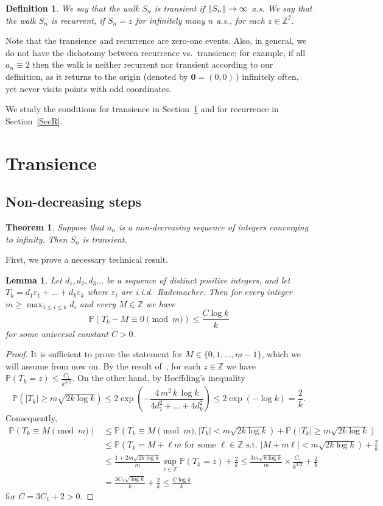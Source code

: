 \documentclass[12pt]{article}
\newtheorem{theorem}{Theorem}
\newtheorem{lemma}{Lemma}
\newtheorem{definition}{Definition}
\newcommand\eps{\varepsilon}
\renewcommand\P{\mathbb{P}}
\newcommand\Z{\mathbb{Z}}
\DeclarePairedDelimiter{\norm}{\lVert}{\rVert}
\begin{document}
\begin{definition}\label{defTR}
We say that the walk $S_n$ is transient if $\norm{S_n}\to\infty$ a.s. We say that the walk $S_n$ is {\em recurrent}, if $S_n=z$ for infinitely many $n$ a.s., for each $z\in\Z^2$.
\end{definition}

Note that the transience and recurrence are zero-one events. Also, in general, we do not have the dichotomy between recurrence vs.\ transience; for example, if all $a_n\equiv 2$ then the walk is neither recurrent nor transient according to our definition, as it returns to the origin (denoted by $\mathbf{0}=(0,0)$\,) infinitely often, yet never visits points with odd coordinates.

We study the conditions for transience in Section~\ref{SecT} and for recurrence in Section~\ref{SecR}.


\section{Transience}\label{SecT}
\subsection{Non-decreasing steps}
\begin{theorem}\label{t1}
Suppose that $a_n$ is a non-decreasing sequence of integers converging to infinity. Then $S_n$ is transient.
\end{theorem}

First, we prove a necessary technical result.
\begin{lemma}\label{modlemma}
Let $d_1,d_2,d_3\dots$ be a sequence of distinct positive integers, and let $T_k=d_1\eps_1+\dots+d_k\eps_k$ where  $\eps_i$ are i.i.d.\ Rademacher. Then for every integer $\displaystyle  m\ge \max_{1\le i\le k}d_i$ and every  $M\in\Z$ we have
$$
\P(T_k-M\equiv 0\pmod m)\le \frac{C \log k}{k}    
$$
for  some universal constant $C>0$.
\end{lemma}
\begin{proof}
It is sufficient to prove the statement for $M\in\{0,1,\dots,m-1\}$, which we will assume from now on. By the result of~\cite{SAR}, for each $z\in \Z$ we have $\P(T_k=z)\le \frac{C_1}{k^{3/2}}$. On the other hand, by Hoeffding's inequality~\cite{Hoe}
$$
\P(|T_k|\ge m \sqrt{2k\log k})\le 2\exp\left(-\frac{4\,m^2\,k\, \log k}{4d_1^2+\dots+4d_k^2}\right)\le2\exp(-\log k)=\frac{2}{k}.
$$
Consequently,
\begin{align*}
\P(T_k\equiv M\pmod m)&\le \P(T_k\equiv M\pmod m, |T_k|<m\sqrt{2k\log k})+
\P(|T_k|\ge m \sqrt{2k\log k})
\\ &
\le 
\P(T_k=M+\ell m\text{ for some $\ell\in\Z$ s.t. } |M+m\ell|<m \sqrt{2k\log k})+\frac2{k}
\\ &
\le \frac{1+2m \sqrt{2k\log k}}{m}\sup_{z\in\Z} \P(T_k=z)+\frac2{k}
\le \frac{3m \sqrt{k\log k}}{m}\times\frac{C_1}{k^{3/2}}+\frac2{k}
\\ &
= \frac{3C_1 \sqrt{\log k}}{k}+\frac2{k}\le\frac{C\log k}{k}
\end{align*}
for $C=3C_1+2>0$.
\end{proof}
\end{document}
